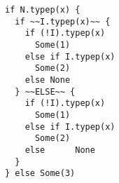 \begin{lstlisting}[style=reclojureScala]
if N.typep(x) {
  if ~~I.typep(x)~~ {
    if (!I).typep(x)
      Some(1)
    else if I.typep(x)
      Some(2)
    else None
  } ~~ELSE~~ {
    if (!I).typep(x)
      Some(1)
    else if I.typep(x)
      Some(2)
    else      None
  }
} else Some(3)
\end{lstlisting}
